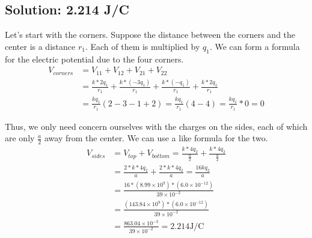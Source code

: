 \documentclass[12pt]{article}
\begin{document}
\subsection*{Solution: 2.214 \unit{\joule/\coulomb}}
Let's start with the corners.
Suppose the distance between the corners and the center is a distance $r_1$. Each of them is multiplied by $q_1$.
We can form a formula for the electric potential due to the four corners.
\begin{align*}
    V_{corners} &=  V_{11} + V_{12} + V_{21} + V_{22}\\
        &=  \frac{k*2q_1}{r_1} + \frac{k*(-3q_1)}{r_1} + \frac{k*(-q_1)}{r_1} + \frac{k*2q_1}{r_1}\\
        &=  \frac{kq_1}{r_1}(2 - 3 - 1 + 2)
        =   \frac{kq_1}{r_1}(4 - 4)
        =   \frac{kq_1}{r_1} * 0
        =   0
\end{align*}

Thus, we only need concern ourselves with the charges on the sides, each of which are only $\frac{a}{2}$ away from the center.
We can use a like formula for the two.
\begin{align*}
    V_{sides}   &=  V_{top} + V_{bottom}
        =   \frac{k*4q_2}{\frac{a}{2}} + \frac{k*4q_2}{\frac{a}{2}}\\
        &=  \frac{2*k*4q_2}{a} + \frac{2*k*4q_2}{a}
        =   \frac{16kq_2}{a}\\
        &=  \frac{16 * (8.99 \times 10^9) * (6.0 \times 10^{-12})}{39 \times 10^{-2}}\\
        &=  \frac{(143.84 \times 10^9) * (6.0 \times 10^{-12})}{39 \times 10^{-2}}\\
        &=  \frac{863.04 \times 10^{-3}}{39 \times 10^{-2}}
        =   \boxed{2.214 \unit{\joule/\coulomb}}
\end{align*}
\end{document}
